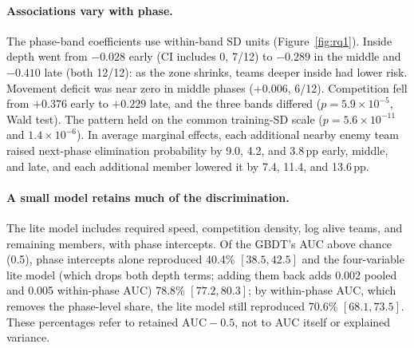 \documentclass[sigconf,anonymous,nonacm]{acmart}
\begin{document}
\paragraph{Associations vary with phase.}
The phase-band coefficients use within-band SD units (Figure~\ref{fig:rq1}).
Inside depth went from $-0.028$ early (CI includes 0, 7/12) to $-0.289$ in the middle and $-0.410$ late (both 12/12): as the zone shrinks, teams deeper inside had lower risk.
Movement deficit was near zero in middle phases ($+0.006$, 6/12).
Competition fell from $+0.376$ early to $+0.229$ late, and the three bands differed ($p=5.9\times10^{-5}$, Wald test).
The pattern held on the common training-SD scale ($p=5.6\times10^{-11}$ and $1.4\times10^{-6}$).
In average marginal effects, each additional nearby enemy team raised next-phase elimination probability by 9.0, 4.2, and 3.8\,pp early, middle, and late, and each additional member lowered it by 7.4, 11.4, and 13.6\,pp.

\paragraph{A small model retains much of the discrimination.}
The lite model includes required speed, competition density, log alive teams, and remaining members, with phase intercepts.
Of the GBDT's AUC above chance (0.5), phase intercepts alone reproduced 40.4\% $[38.5, 42.5]$ and the four-variable lite model (which drops both depth terms; adding them back adds 0.002 pooled and 0.005 within-phase AUC) 78.8\% $[77.2, 80.3]$; by within-phase AUC, which removes the phase-level share, the lite model still reproduced 70.6\% $[68.1, 73.5]$. These percentages refer to retained $\mathrm{AUC}-0.5$, not to AUC itself or explained variance.
\end{document}
